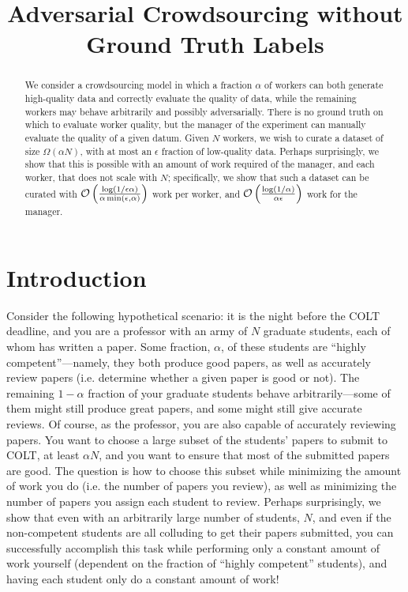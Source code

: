 \documentclass[anon,12pt]{colt2016} %
\title[Avoiding Imposters and Delinquents: Adversarial Crowdsourcing without Ground Truth Labels]{Adversarial Crowdsourcing without Ground Truth Labels}
\newcommand{\goodfrac}{\alpha}
\newcommand{\quality}{\epsilon}
\begin{document}
\maketitle

\begin{abstract}
We consider a crowdsourcing model in which a fraction $\goodfrac$ of 
workers can both generate high-quality data and correctly evaluate 
the quality of data, while the remaining workers may behave arbitrarily and possibly adversarially. 
There is no ground truth on which to evaluate worker quality, but the 
manager of the experiment can manually evaluate the quality of 
a given datum. Given $N$ workers, we wish to curate a dataset 
of size $\Omega(\goodfrac N)$, with at most an $\quality$ fraction of low-quality 
data.  Perhaps surprisingly, we show that this is possible with an amount of work required of the manager, and each worker, that does not scale with $N$; specifically, we show that such a dataset can be curated with
$\oo\p{\frac{\log(1/\quality\goodfrac)}{\goodfrac\min\p{\quality,\goodfrac}}}$ 
work per worker, and $\oo\p{\frac{\log(1/\goodfrac)}{\goodfrac\quality}}$ 
work for the manager.
\end{abstract}

\begin{keywords}
\end{keywords}

\section{Introduction}
Consider the following hypothetical scenario: it is the night before the COLT deadline, and you are a professor with an army of $N$ graduate students, each of whom has written a paper.  Some fraction, $\goodfrac$, of these students are ``highly competent''---namely, they both produce good papers, as well as accurately review papers (i.e. determine whether a given paper is good or not).  The remaining $1-\goodfrac$ fraction of your graduate students behave arbitrarily---some of them might still produce great papers, and some might still give accurate reviews.  Of course, as the professor, you are also capable of accurately reviewing papers.  You want to choose a large subset of the students' papers to submit to COLT, at least $\goodfrac N$, and you want to ensure that most of the submitted papers are good.  The question is how to choose this subset while minimizing the amount of work you do (i.e. the number of papers you review), as well as minimizing the number of papers you assign each student to review.  Perhaps surprisingly, we show that even with an arbitrarily large number of students, $N$, and even if the non-competent students are all colluding to get their papers submitted, you can successfully accomplish this task while performing only a constant amount of work yourself (dependent on the fraction of ``highly competent'' students), and having each student only do a constant amount of work!
\end{document}

